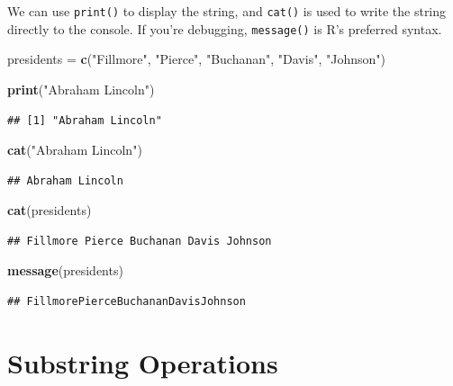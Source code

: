 \documentclass[
]{book}
\newenvironment{Shaded}{\begin{snugshade}}{\end{snugshade}}
\newcommand{\KeywordTok}[1]{\textcolor[rgb]{0.13,0.29,0.53}{\textbf{#1}}}
\newcommand{\NormalTok}[1]{#1}
\newcommand{\StringTok}[1]{\textcolor[rgb]{0.31,0.60,0.02}{#1}}
\begin{document}
We can use \texttt{print()} to display the string, and \texttt{cat()} is used to write the string directly to the console. If you're debugging, \texttt{message()} is R's preferred syntax.

\begin{Shaded}
\begin{Highlighting}[]
\NormalTok{presidents =}\StringTok{ }\KeywordTok{c}\NormalTok{(}\StringTok{"Fillmore"}\NormalTok{, }\StringTok{"Pierce"}\NormalTok{, }\StringTok{"Buchanan"}\NormalTok{, }\StringTok{"Davis"}\NormalTok{, }\StringTok{"Johnson"}\NormalTok{)}

\KeywordTok{print}\NormalTok{(}\StringTok{"Abraham Lincoln"}\NormalTok{)}
\end{Highlighting}
\end{Shaded}

\begin{verbatim}
## [1] "Abraham Lincoln"
\end{verbatim}

\begin{Shaded}
\begin{Highlighting}[]
\KeywordTok{cat}\NormalTok{(}\StringTok{"Abraham Lincoln"}\NormalTok{)}
\end{Highlighting}
\end{Shaded}

\begin{verbatim}
## Abraham Lincoln
\end{verbatim}

\begin{Shaded}
\begin{Highlighting}[]
\KeywordTok{cat}\NormalTok{(presidents)}
\end{Highlighting}
\end{Shaded}

\begin{verbatim}
## Fillmore Pierce Buchanan Davis Johnson
\end{verbatim}

\begin{Shaded}
\begin{Highlighting}[]
\KeywordTok{message}\NormalTok{(presidents)}
\end{Highlighting}
\end{Shaded}

\begin{verbatim}
## FillmorePierceBuchananDavisJohnson
\end{verbatim}

\hypertarget{substring-operations}{%
\section{Substring Operations}\label{substring-operations}}
\end{document}
